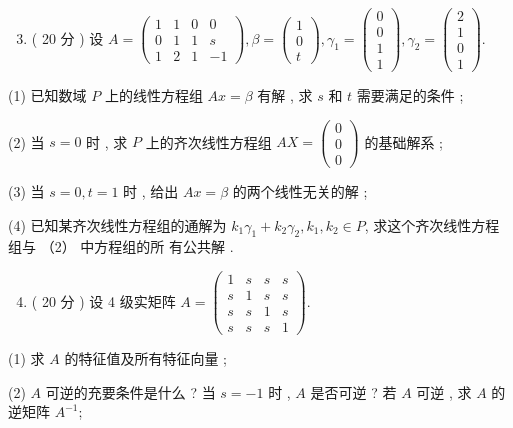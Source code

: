 \documentclass[10pt]{article}
\begin{document}
{\begin{enumerate}
  \setcounter{enumi}{2}
  \item ( 20  分 )  设  $A=\left(\begin{array}{cccc}1 & 1 & 0 & 0 \\ 0 & 1 & 1 & s \\ 1 & 2 & 1 & -1\end{array}\right), \beta=\left(\begin{array}{c}1 \\ 0 \\ t\end{array}\right), \gamma_{1}=\left(\begin{array}{l}0 \\ 0 \\ 1 \\ 1\end{array}\right), \gamma_{2}=\left(\begin{array}{l}2 \\ 1 \\ 0 \\ 1\end{array}\right)$.
\end{enumerate}
(1)  已知数域  $P$  上的线性方程组  $A x=\beta$  有解 ,  求  $s$  和  $t$  需要满足的条件 ;

(2)  当  $s=0$  时 ,  求  $P$  上的齐次线性方程组  $A X=\left(\begin{array}{l}0 \\ 0 \\ 0\end{array}\right)$  的基础解系 ;

(3)  当  $s=0, t=1$  时 ,  给出  $A x=\beta$  的两个线性无关的解 ;

(4)  已知某齐次线性方程组的通解为  $k_{1} \gamma_{1}+k_{2} \gamma_{2}, k_{1}, k_{2} \in P$,  求这个齐次线性方程组与 （2） 中方程组的所   有公共解 .

\begin{enumerate}
  \setcounter{enumi}{3}
  \item ( 20  分 )  设  4  级实矩阵  $A=\left(\begin{array}{llll}1 & s & s & s \\ s & 1 & s & s \\ s & s & 1 & s \\ s & s & s & 1\end{array}\right)$.
\end{enumerate}
(1)  求  $A$  的特征值及所有特征向量 ;

(2) $A$  可逆的充要条件是什么 ?  当  $s=-1$  时 , $A$  是否可逆 ?  若  $A$  可逆 ,  求  $A$  的逆矩阵  $A^{-1}$;

}
\end{document}
